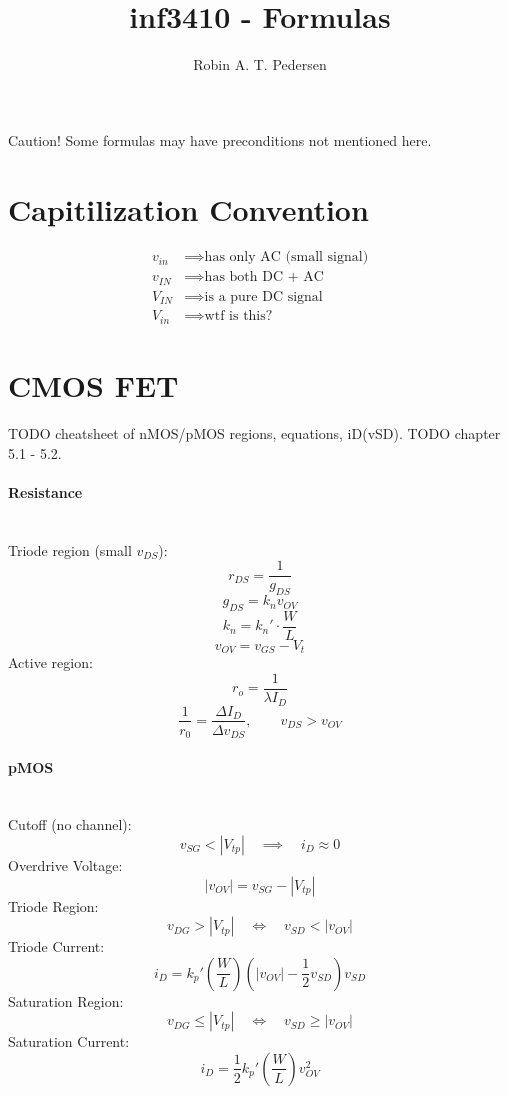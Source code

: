 \documentclass[twocolumn]{article}
\begin{document}
  \title{inf3410 - Formulas}
  \author{Robin A. T. Pedersen}
  \maketitle

  Caution! Some formulas may have preconditions not mentioned here.

  \section{Capitilization Convention}
    \begin{align}
      v_{in} &\implies \text{has only AC (small signal)} \\
      v_{IN} &\implies \text{has both DC + AC} \\
      V_{IN} &\implies \text{is a pure DC signal} \\
      V_{in} &\implies \text{wtf is this?}
    \end{align}

  \section{CMOS FET}
    TODO cheatsheet of nMOS/pMOS regions, equations, iD(vSD).
    TODO chapter 5.1 - 5.2.

    \paragraph{Resistance} \hfill \\
      Triode region (small $v_{DS}$):
        $$r_{DS} = \frac{1}{g_{DS}}$$
        $$g_{DS} = k_n v_{OV}$$
        $$k_n = k_n' \cdot \frac{W}{L}$$
        $$v_{OV} = v_{GS} - V_t$$
      Active region:
        $$r_o = \frac{1}{\lambda I_D}$$
        $$\frac{1}{r_0} = \frac{\Delta I_D}{\Delta v_{DS}},
          \qquad v_{DS} > v_{OV}$$

    \paragraph{pMOS} \hfill \\
      Cutoff (no channel):
        $$v_{SG} < |V_{tp}| \quad\implies\quad i_D \approx 0$$
      Overdrive Voltage:
        $$|v_{OV}| = v_{SG} - |V_{tp}|$$
      Triode Region:
        $$v_{DG} > |V_{tp}| \quad\Leftrightarrow\quad v_{SD} < |v_{OV}|$$
      Triode Current:
        $$i_D = k_p' \left( \frac{W}{L} \right)
                     \left( |v_{OV}| - \frac{1}{2} v_{SD} \right) v_{SD}$$
      Saturation Region:
        $$v_{DG} \leq |V_{tp}| \quad\Leftrightarrow\quad v_{SD} \geq |v_{OV}|$$
      Saturation Current:
        $$i_D = \frac{1}{2} k_p' \left( \frac{W}{L} \right) v_{OV}^2$$
\end{document}
